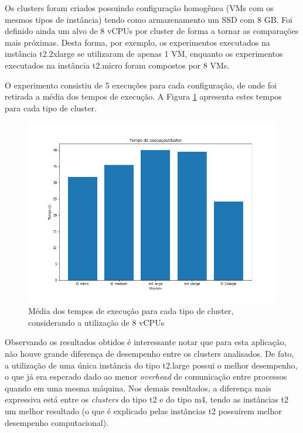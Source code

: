 \documentclass[a4paper,11pt]{article}
\begin{document}
Os clusters foram criados possuindo configuração homogênea (VMs com os mesmos tipos de instância) tendo como armazenamento um SSD com 8 GB. Foi definido ainda um alvo de 8 vCPUs por cluster de forma a tornar as comparações mais próximas. Desta forma, por exemplo, os experimentos executados na instância t2.2xlarge se utilizaram de apenas 1 VM, enquanto os experimentos executados na instância t2.micro foram compostos por 8 VMs.


O experimento consistiu de 5 execuções para cada configuração, de onde foi retirada a média dos tempos de execução. A Figura \ref{fig:tempoCluster} apresenta estes tempos para cada tipo de cluster.



\begin{figure}[h!]
	\center
	\includegraphics[scale=0.4]{figs/AllNodesTime.png}
	\caption{Média dos tempos de execução para cada tipo de cluster, considerando a utilização de 8 vCPUs}
	\label{fig:tempoCluster}
\end{figure}

Observando os resultados obtidos é interessante notar que para esta aplicação, não houve grande diferença de desempenho  entre os clusters analisados. De fato, a utilização de uma única instância do tipo t2.large possui o melhor desempenho, o que já era esperado dado ao menor \textit{overhead} de comunicação entre processos quando em uma mesma máquina. Nos demais resultados, a diferença mais expressiva está entre os \textit{clusters} do tipo t2 e do tipo m4, tendo as instâncias t2 um melhor resultado (o que é explicado pelas instâncias t2 possuírem melhor desempenho computacional). %
\end{document}

